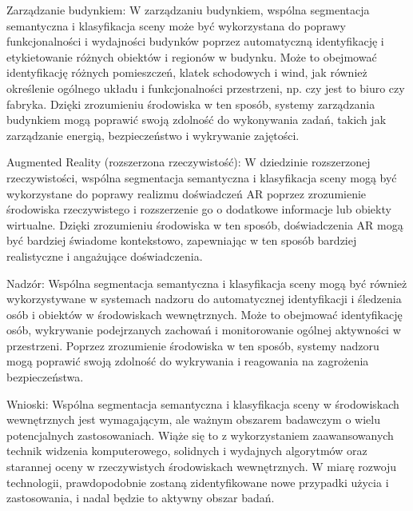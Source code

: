 Zarządzanie budynkiem:
W zarządzaniu budynkiem, wspólna segmentacja semantyczna i klasyfikacja sceny może być wykorzystana do poprawy funkcjonalności i wydajności budynków poprzez automatyczną identyfikację i etykietowanie różnych obiektów i regionów w budynku. Może to obejmować identyfikację różnych pomieszczeń, klatek schodowych i wind, jak również określenie ogólnego układu i funkcjonalności przestrzeni, np. czy jest to biuro czy fabryka. Dzięki zrozumieniu środowiska w ten sposób, systemy zarządzania budynkiem mogą poprawić swoją zdolność do wykonywania zadań, takich jak zarządzanie energią, bezpieczeństwo i wykrywanie zajętości.

Augmented Reality (rozszerzona rzeczywistość):
W dziedzinie rozszerzonej rzeczywistości, wspólna segmentacja semantyczna i klasyfikacja sceny mogą być wykorzystane do poprawy realizmu doświadczeń AR poprzez zrozumienie środowiska rzeczywistego i rozszerzenie go o dodatkowe informacje lub obiekty wirtualne. Dzięki zrozumieniu środowiska w ten sposób, doświadczenia AR mogą być bardziej świadome kontekstowo, zapewniając w ten sposób bardziej realistyczne i angażujące doświadczenia.

Nadzór:
Wspólna segmentacja semantyczna i klasyfikacja sceny mogą być również wykorzystywane w systemach nadzoru do automatycznej identyfikacji i śledzenia osób i obiektów w środowiskach wewnętrznych. Może to obejmować identyfikację osób, wykrywanie podejrzanych zachowań i monitorowanie ogólnej aktywności w przestrzeni. Poprzez zrozumienie środowiska w ten sposób, systemy nadzoru mogą poprawić swoją zdolność do wykrywania i reagowania na zagrożenia bezpieczeństwa.

Wnioski:
Wspólna segmentacja semantyczna i klasyfikacja sceny w środowiskach wewnętrznych jest wymagającym, ale ważnym obszarem badawczym o wielu potencjalnych zastosowaniach. Wiąże się to z wykorzystaniem zaawansowanych technik widzenia komputerowego, solidnych i wydajnych algorytmów oraz starannej oceny w rzeczywistych środowiskach wewnętrznych. W miarę rozwoju technologii, prawdopodobnie zostaną zidentyfikowane nowe przypadki użycia i zastosowania, i nadal będzie to aktywny obszar badań.
